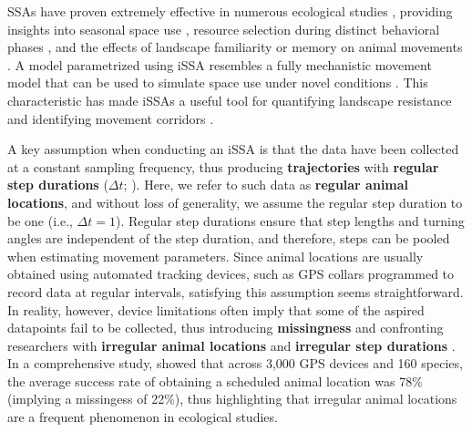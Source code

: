 \documentclass[abstract=on,10pt,a4paper,bibliography=totocnumbered]{article}
\begin{document}
SSAs have proven extremely effective in numerous ecological studies
\citep{Thurfjell.2014}, providing insights into seasonal space use
\citep{Vales.2022, Enns.2023}, resource selection during distinct behavioral
phases \citep{Elliot.2014, Abrahms.2017, Cozzi.2018, Broekhuis.2019}, and the
effects of landscape familiarity or memory on animal movements \citep{Kim.2023}.
A model parametrized using iSSA resembles a fully mechanistic movement model
that can be used to simulate space use under novel conditions \citep{Avgar.2016,
Signer.2017, Hofmann.2023, Signer.2023}. This characteristic has made iSSAs a
useful tool for quantifying landscape resistance and identifying movement
corridors \citep{Zeller.2020, Buchholtz.2020, Hofmann.2021, Hofmann.2023}.



A key assumption when conducting an iSSA is that the data have been collected at
a constant sampling frequency, thus producing \textbf{trajectories} with
\textbf{regular step durations} ($\Delta t$; \citealp{Fortin.2005,
Thurfjell.2014}). Here, we refer to such data as \textbf{regular animal
locations}, and without loss of generality, we assume the regular step duration
to be one (i.e., $\Delta t = 1$). Regular step durations ensure that
step lengths and turning angles are independent of the step duration, and
therefore, steps can be pooled when estimating movement parameters.
Since animal locations are usually obtained using automated tracking devices,
such as GPS collars programmed to record data at regular intervals, satisfying
this assumption seems straightforward. In reality, however, device limitations
often imply that some of the aspired datapoints fail to be collected, thus
introducing \textbf{missingness} and confronting researchers with
\textbf{irregular animal locations} and \textbf{irregular step durations}
\citep{Frair.2010}. In a comprehensive study, \citet{Hofman.2019} showed that
across 3,000 GPS devices and 160 species, the average success rate of obtaining
a scheduled animal location was 78\% (implying a missingess of 22\%), thus
highlighting that irregular animal locations are a frequent phenomenon in
ecological studies.
\end{document}
